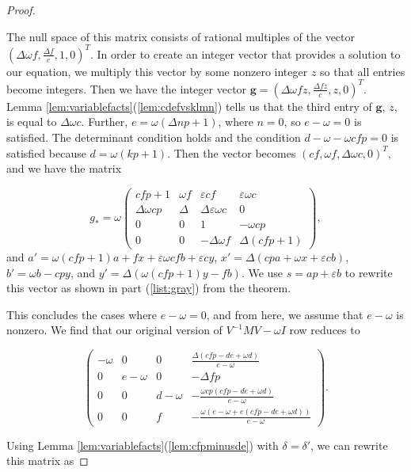 \documentclass{amsart}     %
\theoremstyle{definition}
\begin{document}
\begin{proof}
\begin{enumerate}
The null space of this matrix consists of rational multiples of the vector $(\Delta \omega  f, \frac{\Delta f}{c}, 1, 0)^T$. In order to create an integer vector that provides a solution to our equation, we multiply this vector by some nonzero integer $z$ so that all entries become integers. Then we have the integer vector $\textbf{g} = (\Delta \omega  f z, \frac{\Delta f z}{c}, z, 0)^T$.
 Lemma \ref{lem:variablefacts}(\ref{lem:cdefvsklmn}) tells us that the third entry of $\textbf{g}$, $z$, is equal to $\Delta \omega c$. Further, $e = \omega(\Delta np + 1)$, where $n=0$, so $e - \omega = 0$ is satisfied. The determinant condition holds and the condition $d - \omega   - \omega  cfp  = 0$ is satisfied because $d = \omega (kp+1)$. Then the vector becomes $( cf,  \omega f, \Delta \omega c, 0)^T$, and we have the matrix 



\[g_* = \omega \begin{pmatrix}  cfp+1 & \omega f & \varepsilon cf  & \varepsilon\omega c \\
\Delta \omega cp &  \Delta & \Delta \varepsilon\omega c & 0 \\ 
0 & 0 &  1 & - \omega cp \\ 
0 & 0 & -\Delta\omega f & \Delta(cfp + 1) \end{pmatrix},\]
%
and $a' = \omega (cfp+1)a + f x + \varepsilon \omega cf b + \varepsilon c y$, 
$x' = \Delta (cp a +  \omega x + \varepsilon c b )$, 
$b' = \omega b - c p y$, and $
y' = \Delta(  \omega (cfp + 1) y - f b).$ We use $s = ap + \varepsilon b$ to rewrite this vector as shown in part (\ref{list:gray}) from the theorem.

\end{enumerate}


This concludes the cases where $e - \omega  = 0$, and from here, we assume that $e-\omega  $ is nonzero. We find that our original version of $V^{-1}MV - \omega  I$ row reduces to  

\[  \begin{pmatrix} -\omega  & 0 & 0 &  \frac{\Delta (cfp - de + \omega  d)}{e - \omega } \\
 0& e - \omega  & 0 & -\Delta f p\\ 
0 & 0 & d - \omega   & -\frac{ \omega  cp (cfp - de + \omega  d)}{e - \omega } \\ 
0 & 0 & f & - \frac{\omega (e-\omega  + e(cfp - de + \omega  d)) }{e-\omega }\end{pmatrix}.\]

Using Lemma \ref{lem:variablefacts}(\ref{lem:cfpminusde}) with $\delta = \delta'$, we can rewrite this matrix as 


\end{proof}
\end{document}
